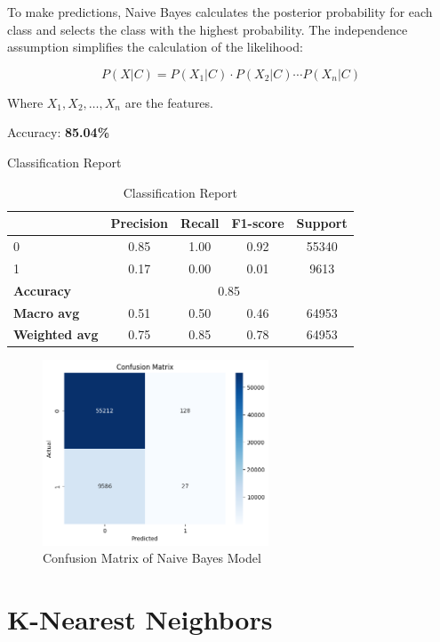 To make predictions, Naive Bayes calculates the posterior probability for each class and selects the class with the highest probability. The independence assumption simplifies the calculation of the likelihood:

\[
P(X | C) = P(X_1 | C) \cdot P(X_2 | C) \cdots P(X_n | C)
\]

Where \( X_1, X_2, \ldots, X_n \) are the features.

Accuracy: \textbf{85.04\%}


Classification Report
\begin{table}[h]
    \centering
    \begin{tabular}{lcccc}
        \toprule
        & \textbf{Precision} & \textbf{Recall} & \textbf{F1-score} & \textbf{Support} \\
        \midrule
        0 & 0.85 & 1.00 & 0.92 & 55340 \\
        1 & 0.17 & 0.00 & 0.01 & 9613 \\
        \midrule
        \textbf{Accuracy} & \multicolumn{4}{c}{0.85} \\
        \textbf{Macro avg} & 0.51 & 0.50 & 0.46 & 64953 \\
        \textbf{Weighted avg} & 0.75 & 0.85 & 0.78 & 64953 \\
        \bottomrule
    \end{tabular}
    \caption{Classification Report}
    \label{tab:classification_report}
\end{table}

\begin{figure}[h] 
    \centering 
    \includegraphics[width=0.6\textwidth]{media/naive_bayes_confusion_matrix.png}
    \caption{Confusion Matrix of Naive Bayes Model}

\end{figure}


\newpage


\section{K-Nearest Neighbors}

